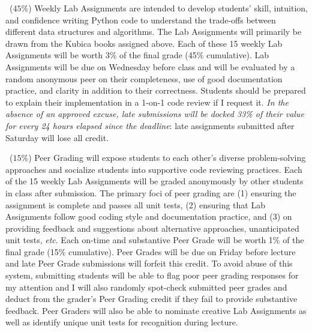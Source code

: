\documentclass[10pt]{memoir}
\begin{document}
    \begin{description}[itemsep=0pt,labelsep=0pt]
        \item[Lab Assignments]~($45\%$) Weekly Lab Assignments are intended to develop students' skill, intuition, and confidence writing Python code to understand the trade-offs between different data structures and algorithms. The Lab Assignments will primarily be drawn from the Kubica books assigned above. Each of these 15 weekly Lab Assignments will be worth 3\% of the final grade (45\% cumulative). Lab Assignments will be due on Wednesday before class and will be evaluated by a random anonymous peer on their completeness, use of good documentation practice, and clarity in addition to their correctness. Students should be prepared to explain their implementation in a 1-on-1 code review if I request it. \textit{In the absence of an approved excuse, late submissions will be docked 33\% of their value for every 24 hours elapsed since the deadline}: late assignments submitted after Saturday will lose all credit.
        \item[Peer Grading]~($15\%$) Peer Grading will expose students to each other's diverse problem-solving approaches and socialize students into supportive code reviewing practices. Each of the 15 weekly Lab Assignments will be graded anonymously by other students in class after submission. The primary foci of peer grading are (1) ensuring the assignment is complete and passes all unit tests, (2) ensuring that Lab Assignments follow good coding style and documentation practice, and (3) on providing feedback and suggestions about alternative approaches, unanticipated unit tests, \textit{etc}. Each on-time and substantive Peer Grade will be worth 1\% of the final grade (15\% cumulative). Peer Grades will be due on Friday before lecture and late Peer Grade submissions will forfeit this credit. To avoid abuse of this system, submitting students will be able to flag poor peer grading responses for my attention and I will also randomly spot-check submitted peer grades and deduct from the grader's Peer Grading credit if they fail to provide substantive feedback. Peer Graders will also be able to nominate creative Lab Assignments as well as identify unique unit tests for recognition during lecture.

\end{description}
\end{document}
